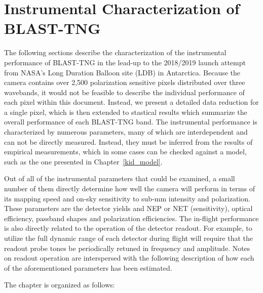 \chapter{Instrumental Characterization of BLAST-TNG}\label{blast_data}

The following sections describe the characterization of the instrumental performance of BLAST-TNG in the lead-up to the 2018/2019 launch attempt from NASA's Long Duration Balloon site (LDB) in Antarctica. Because the camera contains over 2,500 polarization sensitive pixels distributed over three wavebands, it would not be feasible to describe the individual performance of each pixel within this document. Instead, we present a detailed data reduction for a single pixel, which is then extended to stastical results which summarize the overall performance of each BLAST-TNG band. The instrumental performance is characterized by numerous parameters, many of which are interdependent and can not be directly measured. Instead, they must be inferred from the results of empirical measurements, which in some cases can be checked against a model, such as the one presented in Chapter~\ref{kid_model}.

Out of all of the instrumental parameters that could be examined, a small number of them directly determine how well the camera will perform in terms of its mapping speed and on-sky sensitivity to sub-mm intensity and polarization. These parameters are the detector yields and NEP or NET (sensitivity), optical efficiency, passband shapes and polarization efficiencies. The in-flight performance is also directly related to the operation of the detector readout. For example, to utilize the full dynamic range of each detector during flight will require that the readout probe tones be periodically retuned in frequency and amplitude. Notes on readout operation are interspersed with the following description of how each of the aforementioned parameters has been estimated.

The chapter is organized as follows:

